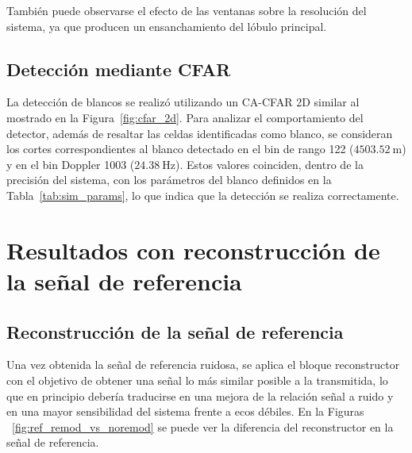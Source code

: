 



También puede observarse el efecto de las ventanas sobre la resolución del sistema, ya que producen un ensanchamiento del lóbulo principal.



\subsection{Detección mediante CFAR}

La detección de blancos se realizó utilizando un CA-CFAR 2D similar al mostrado en la Figura~\ref{fig:cfar_2d}. Para analizar el comportamiento del detector, además de resaltar las celdas identificadas como blanco, se consideran los cortes correspondientes al blanco detectado en el bin de rango 122 ($4503.52\ \text{m}$) y en el bin Doppler 1003 ($24.38\ \text{Hz}$). Estos valores coinciden, dentro de la precisión del sistema, con los parámetros del blanco definidos en la Tabla~\ref{tab:sim_params}, lo que indica que la detección se realiza correctamente.










\section{Resultados con reconstrucción de la señal de referencia}



\subsection{Reconstrucción de la señal de referencia}



Una vez obtenida la señal de referencia ruidosa, se aplica el bloque reconstructor con el objetivo de obtener una señal lo más similar posible a la transmitida, lo que en principio debería traducirse en una mejora de la relación señal a ruido y en una mayor sensibilidad del sistema frente a ecos débiles. En la Figuras ~\ref{fig:ref_remod_vs_noremod} se puede ver la diferencia del reconstructor en la señal de referencia.


